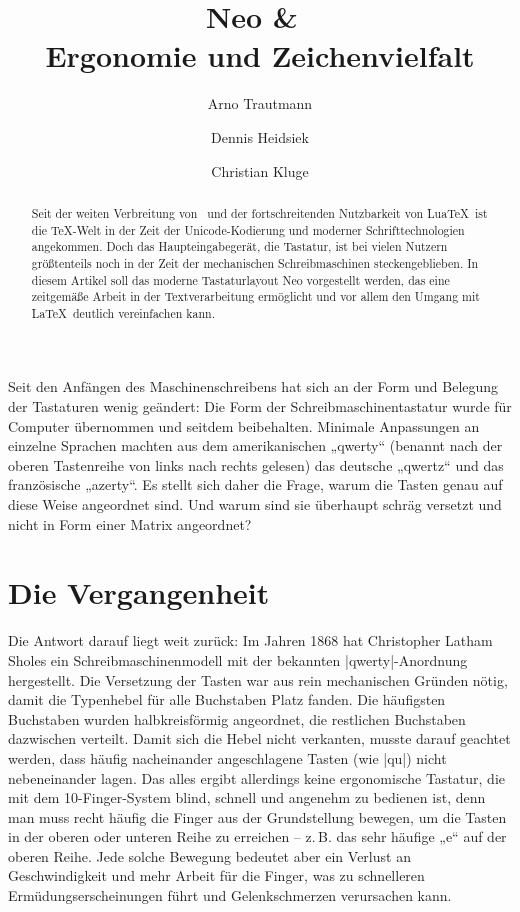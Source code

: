 \documentclass[ngerman]{dtk}
\title{Neo \&\ \XeLaTeX\\Ergonomie und Zeichenvielfalt}
\author{Arno Trautmann\and Dennis Heidsiek\and Christian Kluge}
\newcommand\LuaTeX{Lua\TeX}
\begin{document}
\setmonofont[Scale=0.8]{DejaVu Sans Mono}
\maketitle
\begin{abstract}
Seit der weiten Verbreitung von \XeTeX\ und der fortschreitenden Nutzbarkeit von \LuaTeX\ ist die \TeX-Welt in der Zeit der Unicode-Kodierung und moderner Schrifttechnologien angekommen. Doch das Haupteingabegerät, die Tastatur, ist bei vielen Nutzern größtenteils noch in der Zeit der mechanischen Schreibmaschinen steckengeblieben. In diesem Artikel soll das moderne Tastaturlayout Neo vorgestellt werden, das eine zeitgemäße Arbeit in der Textverarbeitung ermöglicht und vor allem den Umgang mit \LaTeX\ deutlich vereinfachen kann.
\end{abstract}
Seit den Anfängen des Maschinenschreibens hat sich an der Form und Belegung der Tastaturen wenig geändert: Die Form der Schreibmaschinentastatur wurde für Computer übernommen und seitdem beibehalten. Minimale Anpassungen an einzelne Sprachen machten aus dem amerikanischen „\hbox{qwerty}“ (benannt nach der oberen Tastenreihe von links nach rechts gelesen) das deutsche „qwertz“ und das französische „azerty“. Es stellt sich daher die Frage, warum die Tasten genau auf diese Weise angeordnet sind. Und warum sind sie überhaupt schräg versetzt und nicht in Form einer Matrix angeordnet?

\section{Die Vergangenheit}
Die Antwort darauf liegt weit zurück: Im Jahren 1868 hat Christopher Latham Sholes ein Schreibmaschinenmodell mit der bekannten |qwerty|-Anordnung hergestellt.\cite{patentqwerty} Die Versetzung der Tasten war aus rein mechanischen Gründen nötig, damit die Typenhebel für alle Buchstaben Platz fanden. Die häufigsten Buchstaben wurden halbkreisförmig angeordnet, die restlichen Buchstaben dazwischen verteilt. Damit sich die Hebel nicht verkanten, musste darauf geachtet werden, dass häufig nacheinander angeschlagene Tasten (wie |qu|) nicht nebeneinander lagen. Das alles ergibt allerdings keine ergonomische Tastatur, die mit dem 10-Finger-System blind, schnell und angenehm zu bedienen ist, denn man muss recht häufig die Finger aus der Grundstellung bewegen, um die Tasten in der oberen oder unteren Reihe zu erreichen – z.\,B. das sehr häufige „e“ auf der oberen Reihe. Jede solche Bewegung bedeutet aber ein Verlust an Geschwindigkeit und mehr Arbeit für die Finger, was zu schnelleren Ermüdungserscheinungen führt und Gelenkschmerzen verursachen kann.
\end{document}

